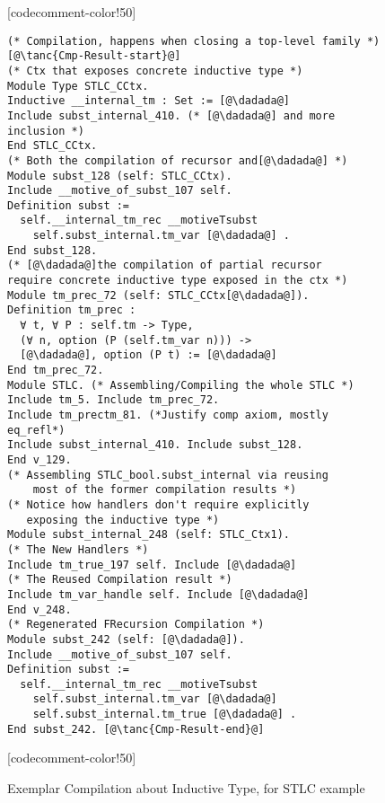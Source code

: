 \begin{figure}
\begin{minipage}{\textwidth}
\begin{multicols}{2}
[codecomment-color!50]



\begin{lstlisting}
(* Compilation, happens when closing a top-level family *) [@\tanc{Cmp-Result-start}@]
(* Ctx that exposes concrete inductive type *)
Module Type STLC_CCtx.
Inductive __internal_tm : Set := [@\dadada@] 
Include subst_internal_410. (* [@\dadada@] and more inclusion *)
End STLC_CCtx.
(* Both the compilation of recursor and[@\dadada@] *)
Module subst_128 (self: STLC_CCtx).
Include __motive_of_subst_107 self.
Definition subst :=
  self.__internal_tm_rec __motiveTsubst
	self.subst_internal.tm_var [@\dadada@] .
End subst_128.
(* [@\dadada@]the compilation of partial recursor 
require concrete inductive type exposed in the ctx *)
Module tm_prec_72 (self: STLC_CCtx[@\dadada@]).
Definition tm_prec :
  ∀ t, ∀ P : self.tm -> Type,
  (∀ n, option (P (self.tm_var n))) ->
  [@\dadada@], option (P t) := [@\dadada@]
End tm_prec_72. 
Module STLC. (* Assembling/Compiling the whole STLC *)
Include tm_5. Include tm_prec_72. 
Include tm_prectm_81. (*Justify comp axiom, mostly eq_refl*)
Include subst_internal_410. Include subst_128.
End v_129.
(* Assembling STLC_bool.subst_internal via reusing 
    most of the former compilation results *)
(* Notice how handlers don't require explicitly
   exposing the inductive type *)
Module subst_internal_248 (self: STLC_Ctx1).
(* The New Handlers *)
Include tm_true_197 self. Include [@\dadada@]
(* The Reused Compilation result *)
Include tm_var_handle self. Include [@\dadada@]
End v_248. 
(* Regenerated FRecursion Compilation *)
Module subst_242 (self: [@\dadada@]).
Include __motive_of_subst_107 self.
Definition subst :=
  self.__internal_tm_rec __motiveTsubst
	self.subst_internal.tm_var [@\dadada@]
    self.subst_internal.tm_true [@\dadada@] .
End subst_242. [@\tanc{Cmp-Result-end}@]
\end{lstlisting}



[codecomment-color!50]

\end{multicols}
\end{minipage}

\caption{Exemplar Compilation about Inductive Type, for STLC example}\label{fig:plugin-example2}
\end{figure}